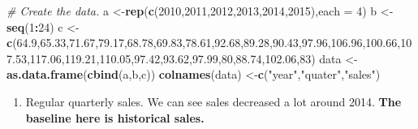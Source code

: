\documentclass[]{book}
\newenvironment{Shaded}{\begin{snugshade}}{\end{snugshade}}
\newcommand{\KeywordTok}[1]{\textcolor[rgb]{0.13,0.29,0.53}{\textbf{#1}}}
\newcommand{\DataTypeTok}[1]{\textcolor[rgb]{0.13,0.29,0.53}{#1}}
\newcommand{\DecValTok}[1]{\textcolor[rgb]{0.00,0.00,0.81}{#1}}
\newcommand{\FloatTok}[1]{\textcolor[rgb]{0.00,0.00,0.81}{#1}}
\newcommand{\StringTok}[1]{\textcolor[rgb]{0.31,0.60,0.02}{#1}}
\newcommand{\CommentTok}[1]{\textcolor[rgb]{0.56,0.35,0.01}{\textit{#1}}}
\newcommand{\OperatorTok}[1]{\textcolor[rgb]{0.81,0.36,0.00}{\textbf{#1}}}
\newcommand{\NormalTok}[1]{#1}
\providecommand{\tightlist}{%
  \setlength{\itemsep}{0pt}\setlength{\parskip}{0pt}}
\theoremstyle{definition}
\theoremstyle{definition}
\theoremstyle{definition}
\theoremstyle{remark}
\begin{document}
\begin{Shaded}
\begin{Highlighting}[]
\CommentTok{# Create the data.}
\NormalTok{a <-}\KeywordTok{rep}\NormalTok{(}\KeywordTok{c}\NormalTok{(}\DecValTok{2010}\NormalTok{,}\DecValTok{2011}\NormalTok{,}\DecValTok{2012}\NormalTok{,}\DecValTok{2013}\NormalTok{,}\DecValTok{2014}\NormalTok{,}\DecValTok{2015}\NormalTok{),}\DataTypeTok{each =} \DecValTok{4}\NormalTok{)}
\NormalTok{b <-}\StringTok{ }\KeywordTok{seq}\NormalTok{(}\DecValTok{1}\OperatorTok{:}\DecValTok{24}\NormalTok{)}
\NormalTok{c <-}\StringTok{ }\KeywordTok{c}\NormalTok{(}\FloatTok{64.9}\NormalTok{,}\FloatTok{65.33}\NormalTok{,}\FloatTok{71.67}\NormalTok{,}\FloatTok{79.17}\NormalTok{,}\FloatTok{68.78}\NormalTok{,}\FloatTok{69.83}\NormalTok{,}\FloatTok{78.61}\NormalTok{,}\FloatTok{92.68}\NormalTok{,}\FloatTok{89.28}\NormalTok{,}\FloatTok{90.43}\NormalTok{,}\FloatTok{97.96}\NormalTok{,}\FloatTok{106.96}\NormalTok{,}\FloatTok{100.66}\NormalTok{,}\FloatTok{107.53}\NormalTok{,}\FloatTok{117.06}\NormalTok{,}\FloatTok{119.21}\NormalTok{,}\FloatTok{110.05}\NormalTok{,}\FloatTok{97.42}\NormalTok{,}\FloatTok{93.62}\NormalTok{,}\FloatTok{97.99}\NormalTok{,}\DecValTok{80}\NormalTok{,}\FloatTok{88.74}\NormalTok{,}\FloatTok{102.06}\NormalTok{,}\DecValTok{83}\NormalTok{)}
\NormalTok{data <-}\StringTok{ }\KeywordTok{as.data.frame}\NormalTok{(}\KeywordTok{cbind}\NormalTok{(a,b,c))}
\KeywordTok{colnames}\NormalTok{(data) <-}\KeywordTok{c}\NormalTok{(}\StringTok{"year"}\NormalTok{,}\StringTok{"quater"}\NormalTok{,}\StringTok{"sales"}\NormalTok{)}
\end{Highlighting}
\end{Shaded}

\begin{enumerate}
\def\labelenumi{\arabic{enumi}.}
\tightlist
\item
  Regular quarterly sales. We can see sales decreased a lot around 2014.
  \textbf{The baseline here is historical sales.}
\end{enumerate}

\begin{Shaded}
\end{Shaded}
\end{document}

